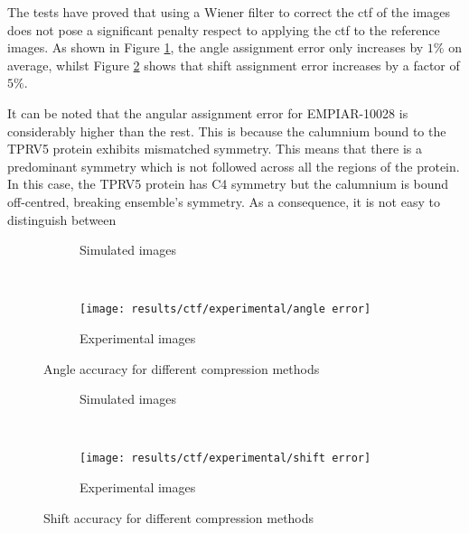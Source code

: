 \documentclass[../main.tex]{subfiles}
\begin{document}
The tests have proved that using a Wiener filter to correct the \gls{ctf} of the images does not pose a significant penalty respect to applying the \gls{ctf} to the reference images. As shown in Figure \ref{fig:5:ctf_angle_accuracy}, the angle assignment error only increases by $1 \si{\percent}$ on average, whilst Figure \ref{fig:5:ctf_shift_accuracy} shows that shift assignment error increases by a factor of $5 \si{\percent}$. 

It can be noted that the angular assignment error for EMPIAR-10028 is considerably higher than the rest. This is because the calumnium bound to the TPRV5 protein exhibits mismatched symmetry. This means that there is a predominant symmetry which is not followed across all the regions of the protein. In this case, the TPRV5 protein has C4 symmetry but the calumnium is bound off-centred, breaking ensemble's symmetry. As a consequence, it is not easy to distinguish between 

\begin{figure}[htbp]
    \centering
    \begin{subfigure}[b]{.8\textwidth}
         \centering
         \caption{Simulated images}
    \end{subfigure}\\
    \vspace{2em}
    \begin{subfigure}[b]{.8\textwidth}
         \centering
         \texttt{[image: results/ctf/experimental/angle error]}
         \caption{Experimental images}
    \end{subfigure}
    \caption{Angle accuracy for different compression methods}
    \label{fig:5:ctf_angle_accuracy}
\end{figure}

\begin{figure}[htbp]
    \centering
    \begin{subfigure}[b]{.8\textwidth}
         \centering
         \caption{Simulated images}
    \end{subfigure}\\
    \vspace{2em}
    \begin{subfigure}[b]{.8\textwidth}
         \centering
         \texttt{[image: results/ctf/experimental/shift error]}
         \caption{Experimental images}
    \end{subfigure}
    \caption{Shift accuracy for different compression methods}
    \label{fig:5:ctf_shift_accuracy}
\end{figure}
\end{document}
